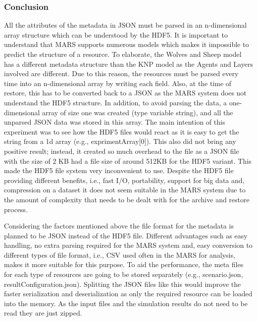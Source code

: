 \subsubsection{Conclusion}
    All the attributes of the metadata in JSON must be parsed in an n-dimensional array structure which can be understood by the HDF5. 
    It is important to understand that MARS supports numerous models which makes it impossible to predict the structure of a resource. To elaborate, the
    Wolves and Sheep \cite{HAWHamburgMARS} model has a different metadata structure than the KNP \cite{HAWHamburgMARS} model as the Agents and Layers involved are 
    different. Due to this reason, the resources
    must be parsed every time into an n-dimensional array by writing each field. Also, at the time of restore, this has to be converted back 
    to a JSON as the MARS system does not understand the HDF5 structure. In addition, to avoid parsing the data, 
    a one-dimensional array of size one was created (type variable string), and all the unparsed JSON data
    was stored in this array. The main intention of this experiment was to see how the HDF5 files would react as it is easy to get the string from a 1d array 
    (e.g., exprimentArray[0]). This also did not bring any positive result; instead, it created so much overhead to the file as a JSON file with the size of 2 KB
    had a file size of around 512KB for the HDF5 variant. This made the HDF5 file system very inconvenient to use.
    Despite the HDF5 file providing different benefits, i.e., fast I/O, portability, support for big data and,
    compression on a dataset it does not seem suitable in the MARS system due to the amount of complexity that needs to be dealt with for the archive and restore process.
    

    Considering the factors mentioned above the file format for the metadata is planned to be JSON instead of the HDF5 file. Different advantages such as easy 
    handling, no extra parsing
    required for the MARS system and, easy conversion to different types of file format, i.e., CSV used often in the MARS for analysis, makes it more suitable for this purpose. 
    To aid the performance, the meta files for each type of resources
    are going to be stored separately (e.g., scenario.json, resultConfiguration.json). Splitting the JSON files like this would improve the faster serialization and 
    deserialization as only the required resource can be loaded into the memory. As the input files and the simulation results do not need to be read they are just zipped.

